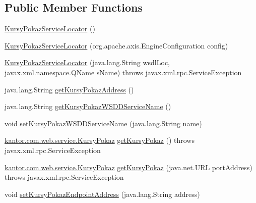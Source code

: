 \subsection*{Public Member Functions}
\begin{DoxyCompactItemize}
\item 
\hyperlink{classkantor_1_1com_1_1web_1_1service_1_1_kursy_pokaz_service_locator_a0d208d2392725d8949b5a5fb10158713}{Kursy\+Pokaz\+Service\+Locator} ()
\item 
\hyperlink{classkantor_1_1com_1_1web_1_1service_1_1_kursy_pokaz_service_locator_a1f352a89dc5535ba4625459762eb5306}{Kursy\+Pokaz\+Service\+Locator} (org.\+apache.\+axis.\+Engine\+Configuration config)
\item 
\hyperlink{classkantor_1_1com_1_1web_1_1service_1_1_kursy_pokaz_service_locator_aab06f25cc581463776c40370cbd8809b}{Kursy\+Pokaz\+Service\+Locator} (java.\+lang.\+String wsdl\+Loc, javax.\+xml.\+namespace.\+Q\+Name s\+Name)  throws javax.\+xml.\+rpc.\+Service\+Exception 
\item 
java.\+lang.\+String \hyperlink{classkantor_1_1com_1_1web_1_1service_1_1_kursy_pokaz_service_locator_acd5a6dea40341b291afd110e9fa0d151}{get\+Kursy\+Pokaz\+Address} ()
\item 
java.\+lang.\+String \hyperlink{classkantor_1_1com_1_1web_1_1service_1_1_kursy_pokaz_service_locator_a587b83681f721371d96d7a3497aab85c}{get\+Kursy\+Pokaz\+W\+S\+D\+D\+Service\+Name} ()
\item 
void \hyperlink{classkantor_1_1com_1_1web_1_1service_1_1_kursy_pokaz_service_locator_acd4085212ac8086417b6994413f2f5e6}{set\+Kursy\+Pokaz\+W\+S\+D\+D\+Service\+Name} (java.\+lang.\+String name)
\item 
\hyperlink{classkantor_1_1com_1_1web_1_1service_1_1_kursy_pokaz}{kantor.\+com.\+web.\+service.\+Kursy\+Pokaz} \hyperlink{classkantor_1_1com_1_1web_1_1service_1_1_kursy_pokaz_service_locator_a7b8fce52b2531330aa94743b2fd80518}{get\+Kursy\+Pokaz} ()  throws javax.\+xml.\+rpc.\+Service\+Exception 
\item 
\hyperlink{classkantor_1_1com_1_1web_1_1service_1_1_kursy_pokaz}{kantor.\+com.\+web.\+service.\+Kursy\+Pokaz} \hyperlink{classkantor_1_1com_1_1web_1_1service_1_1_kursy_pokaz_service_locator_a7752a187f820619249a8ef1b6d54867d}{get\+Kursy\+Pokaz} (java.\+net.\+U\+R\+L port\+Address)  throws javax.\+xml.\+rpc.\+Service\+Exception 
\item 
void \hyperlink{classkantor_1_1com_1_1web_1_1service_1_1_kursy_pokaz_service_locator_a4ff85e81ef5893648efc4db2ea62ee30}{set\+Kursy\+Pokaz\+Endpoint\+Address} (java.\+lang.\+String address)

\end{DoxyCompactItemize}
